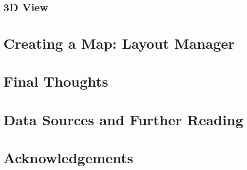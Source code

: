 \documentclass{article}
\begin{document}
\subsection{3D View}

\section{Creating a Map: Layout Manager}

\section{Final Thoughts}

\section{Data Sources and Further Reading}

\section{Acknowledgements}

\newpage
\printbibliography
\end{document}
